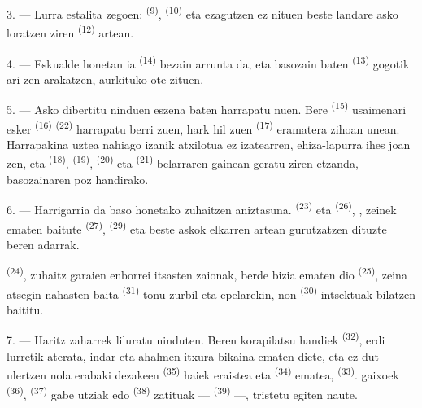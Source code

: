 3. --- Lurra  estalita zegoen: 
\textsuperscript{(9)},  \textsuperscript{(10)} eta ezagutzen ez
nituen beste landare asko loratzen ziren 
\textsuperscript{(12)} artean.

4. --- Eskualde honetan  ia 
\textsuperscript{(14)} bezain arrunta da, eta basozain baten 
\textsuperscript{(13)} gogotik ari zen arakatzen, aurkituko ote zituen.

\VUsaut{3.0mm}
\VUsaut{3.0mm}

5. --- Asko dibertitu ninduen eszena baten  harrapatu nuen. Bere
 \textsuperscript{(15)} usaimenari esker
 \textsuperscript{(16)} 
\textsuperscript{(22)} harrapatu berri zuen, hark hil zuen 
\textsuperscript{(17)} eramatera zihoan unean. Harrapakina uztea nahiago izanik
atxilotua ez izatearren, ehiza-lapurra ihes joan zen, eta 
\textsuperscript{(18)},  \textsuperscript{(19)},
 \textsuperscript{(20)} eta 
\textsuperscript{(21)} belarraren gainean geratu ziren etzanda, basozainaren poz
handirako.

6. --- Harrigarria da baso honetako zuhaitzen aniztasuna. 
\textsuperscript{(23)} eta  \textsuperscript{(26)},
, zeinek  ematen baitute
\textsuperscript{(27)},  \textsuperscript{(29)} eta beste askok
elkarren artean gurutzatzen dituzte beren adarrak.

 \textsuperscript{(24)}, zuhaitz garaien enborrei itsasten
zaionak, berde bizia ematen dio  \textsuperscript{(25)},
zeina atsegin nahasten baita  \textsuperscript{(31)} tonu
zurbil eta epelarekin, non  \textsuperscript{(30)} intsektuak
bilatzen baititu.

\VUsaut{3.0mm}
\VUsaut{3.0mm}

7. --- Haritz zaharrek liluratu ninduten. Beren  korapilatsu
handiek \textsuperscript{(32)}, erdi lurretik aterata, indar eta ahalmen itxura
bikaina ematen diete, eta ez dut ulertzen nola erabaki dezakeen 
\textsuperscript{(35)} haiek eraistea eta 
\textsuperscript{(34)} ematea, 
\textsuperscript{(33)}.  gaixoek \textsuperscript{(36)},
 \textsuperscript{(37)} gabe utziak edo 
\textsuperscript{(38)} zatituak --- 
\textsuperscript{(39)} ---, tristetu egiten naute.

